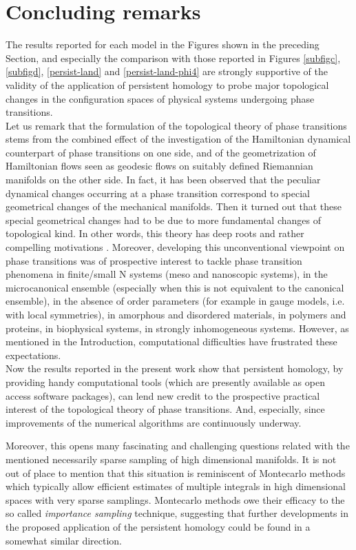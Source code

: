 \documentclass[preprintnumbers,showpacs, showkeys, twocolumn,secnumarabic,amssymb,amsmath,amsfonts,aps, pre]{revtex4-1}
\begin{document}
\section{Concluding remarks}

The results reported for each model in the Figures shown in the preceding Section, and especially the comparison with those reported in Figures \ref{subfigc}, \ref{subfigd}, \ref{persist-land} and 
\ref{persist-land-phi4} are strongly supportive of the validity of the application of persistent homology to probe major topological changes in the configuration spaces of physical systems undergoing phase transitions. \\
Let us remark that the formulation of the topological theory of phase transitions stems from the combined effect of the investigation of the Hamiltonian dynamical counterpart of phase transitions on one side, and of the geometrization of Hamiltonian flows seen as geodesic flows on suitably defined Riemannian manifolds on the other side. In fact, it has been observed that the peculiar dynamical changes occurring at a phase transition correspond to special geometrical changes of the mechanical manifolds. Then it turned out that these special geometrical changes had to be due to more fundamental changes of topological kind. In other words, this theory has deep roots and rather compelling motivations \cite{PettiniBook}. Moreover, developing this unconventional viewpoint on phase transitions was of prospective interest to tackle phase transition phenomena in finite/small N systems (meso and nanoscopic systems), in the microcanonical ensemble (especially when this is not equivalent to the canonical ensemble), in the absence of order parameters (for example in gauge models, i.e. with local symmetries), in amorphous and disordered materials, in polymers and proteins, in biophysical systems, in strongly 
inhomogeneous systems. However, as mentioned in the Introduction, computational difficulties have frustrated these expectations.\\
Now the results reported in the present work show that persistent homology, by providing handy computational tools (which are presently available as open access software packages),  can lend new credit to  the prospective practical interest of the topological theory of phase transitions.
And, especially, since improvements of the numerical algorithms are continuously underway. 

Moreover, this opens many fascinating and challenging questions related with the mentioned necessarily sparse sampling of high dimensional manifolds.
It is not out of place to mention that this situation is reminiscent of Montecarlo methods which typically allow efficient estimates of multiple integrals in high dimensional spaces with very sparse samplings.
Montecarlo methods owe their efficacy to the so called \textit{importance sampling} technique, suggesting that further developments in the proposed application of the persistent homology could be found in a somewhat similar direction.
\end{document}
